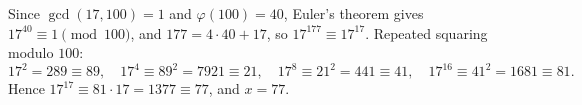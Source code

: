 Since $\gcd(17,100)=1$ and $\varphi(100)=40$, Euler's theorem gives $17^{40}\equiv1\pmod{100}$, and $177=4\cdot40+17$, so $17^{177}\equiv17^{17}$. Repeated squaring modulo $100$:
\[
17^2=289\equiv89,\quad 17^4\equiv89^2=7921\equiv21,\quad 17^8\equiv21^2=441\equiv41,\quad 17^{16}\equiv41^2=1681\equiv81 .
\]
Hence $17^{17}\equiv81\cdot17=1377\equiv77$, and $x=\boxed{77}$.
